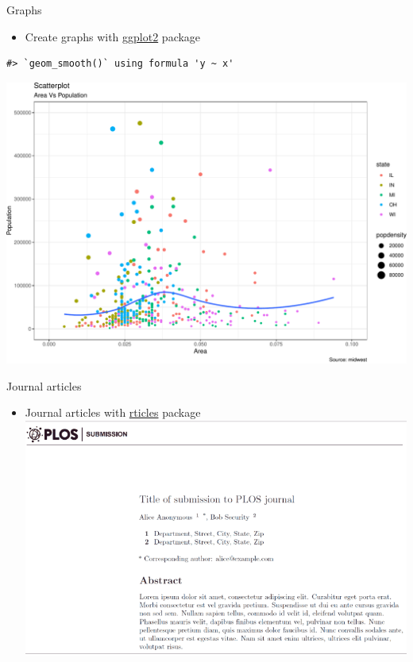 \documentclass[
  8pt,
  ignorenonframetext,
  dvipsnames]{beamer}
\providecommand{\tightlist}{%
  \setlength{\itemsep}{0pt}\setlength{\parskip}{0pt}}
\let\olditem\item
\renewcommand{\item}{%
  \olditem\vspace{4pt}
}
\begin{document}
\begin{frame}[fragile]{Graphs}
\protect\hypertarget{graphs}{}

\begin{itemize}
\tightlist
\item
  Create graphs with \href{https://ggplot2.tidyverse.org/}{ggplot2}
  package
\end{itemize}

\begin{verbatim}
#> `geom_smooth()` using formula 'y ~ x'
\end{verbatim}

\includegraphics{lecture1_files/figure-beamer/unnamed-chunk-4-1.pdf}

\end{frame}

\begin{frame}{Journal articles}
\protect\hypertarget{journal-articles}{}

\begin{itemize}
\tightlist
\item
  Journal articles with
  \href{https://github.com/rstudio/rticles}{rticles} package
  \includegraphics{rticles.png}
\end{itemize}

\end{frame}
\end{document}
